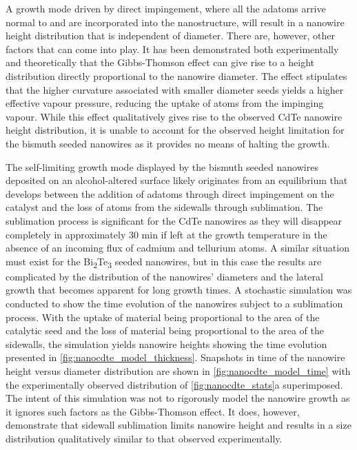 A growth mode driven by direct impingement, where all the adatoms arrive normal to and are incorporated into the nanostructure, will result in a nanowire height distribution that is independent of diameter.
There are, however, other factors that can come into play.
It has been demonstrated both experimentally\cite{Schubert2004a,Wu2002} and theoretically\cite{Kashchiev2006,Chen2006} that the Gibbs-Thomson effect can give rise to a height distribution directly proportional to the nanowire diameter.
The effect stipulates that the higher curvature associated with smaller diameter seeds yields a higher effective vapour pressure, reducing the uptake of atoms from the impinging vapour.
While this effect qualitatively gives rise to the observed CdTe nanowire height distribution, it is unable to account for the observed height limitation for the bismuth seeded nanowires as it provides no means of halting the growth.

The self-limiting growth mode displayed by the bismuth seeded nanowires deposited on an alcohol-altered surface likely originates from an equilibrium that develops between the addition of adatoms through direct impingement on the catalyst and the loss of atoms from the sidewalls through sublimation.
The sublimation process is significant for the CdTe nanowires as they will disappear completely in approximately 30 min if left at the growth temperature in the absence of an incoming flux of cadmium and tellurium atoms.
A similar situation must exist for the Bi\textsubscript{2}Te\textsubscript{3} seeded nanowires, but in this case the results are complicated by the distribution of the nanowires' diameters and the lateral growth that becomes apparent for long growth times.
A stochastic simulation was conducted to show the time evolution of the nanowires subject to a sublimation process.
With the uptake of material being proportional to the area of the catalytic seed and the loss of material being proportional to the area of the sidewalls, the simulation yields nanowire heights showing the time evolution presented in \cref{fig:nanocdte_model_thickness}.
Snapshots in time of the nanowire height versus diameter distribution are shown in \cref{fig:nanocdte_model_time} with the experimentally observed distribution of \cref{fig:nanocdte_stats}a superimposed.
The intent of this simulation was not to rigorously model the nanowire growth as it ignores such factors as the Gibbs-Thomson effect.
It does, however, demonstrate that sidewall sublimation limits nanowire height and results in a size distribution qualitatively similar to that observed experimentally.

